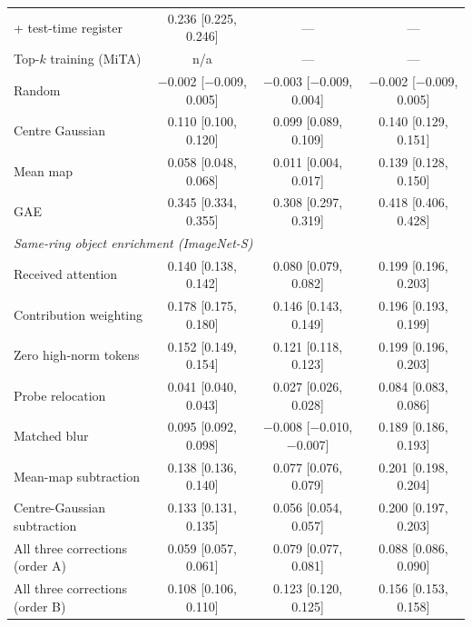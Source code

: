 \begin{tabular}{lccc}
+ test-time register & 0.236 {\scriptsize [0.225, 0.246]} & --- & --- \\
Top-$k$ training (MiTA) & n/a & --- & --- \\
\addlinespace[2pt]
Random & $-$0.002 {\scriptsize [$-$0.009, 0.005]} & $-$0.003 {\scriptsize [$-$0.009, 0.004]} & $-$0.002 {\scriptsize [$-$0.009, 0.005]} \\
Centre Gaussian & 0.110 {\scriptsize [0.100, 0.120]} & 0.099 {\scriptsize [0.089, 0.109]} & 0.140 {\scriptsize [0.129, 0.151]} \\
Mean map & 0.058 {\scriptsize [0.048, 0.068]} & 0.011 {\scriptsize [0.004, 0.017]} & 0.139 {\scriptsize [0.128, 0.150]} \\
GAE & 0.345 {\scriptsize [0.334, 0.355]} & 0.308 {\scriptsize [0.297, 0.319]} & 0.418 {\scriptsize [0.406, 0.428]} \\
\midrule
\multicolumn{4}{l}{\emph{Same-ring object enrichment (ImageNet-S)}} \\
\addlinespace[1pt]
Received attention & 0.140 {\scriptsize [0.138, 0.142]} & 0.080 {\scriptsize [0.079, 0.082]} & 0.199 {\scriptsize [0.196, 0.203]} \\
Contribution weighting & 0.178 {\scriptsize [0.175, 0.180]} & 0.146 {\scriptsize [0.143, 0.149]} & 0.196 {\scriptsize [0.193, 0.199]} \\
\quad Zero high-norm tokens & 0.152 {\scriptsize [0.149, 0.154]} & 0.121 {\scriptsize [0.118, 0.123]} & 0.199 {\scriptsize [0.196, 0.203]} \\
Probe relocation & 0.041 {\scriptsize [0.040, 0.043]} & 0.027 {\scriptsize [0.026, 0.028]} & 0.084 {\scriptsize [0.083, 0.086]} \\
\quad Matched blur & 0.095 {\scriptsize [0.092, 0.098]} & $-$0.008 {\scriptsize [$-$0.010, $-$0.007]} & 0.189 {\scriptsize [0.186, 0.193]} \\
Mean-map subtraction & 0.138 {\scriptsize [0.136, 0.140]} & 0.077 {\scriptsize [0.076, 0.079]} & 0.201 {\scriptsize [0.198, 0.204]} \\
\quad Centre-Gaussian subtraction & 0.133 {\scriptsize [0.131, 0.135]} & 0.056 {\scriptsize [0.054, 0.057]} & 0.200 {\scriptsize [0.197, 0.203]} \\
All three corrections (order A) & 0.059 {\scriptsize [0.057, 0.061]} & 0.079 {\scriptsize [0.077, 0.081]} & 0.088 {\scriptsize [0.086, 0.090]} \\
All three corrections (order B) & 0.108 {\scriptsize [0.106, 0.110]} & 0.123 {\scriptsize [0.120, 0.125]} & 0.156 {\scriptsize [0.153, 0.158]} \\

\end{tabular}

